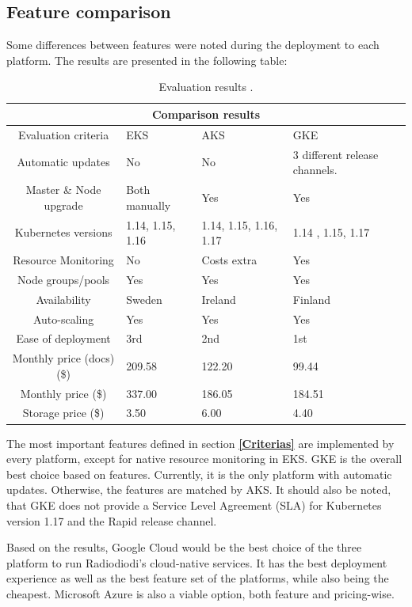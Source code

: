 \documentclass[article]{aaltoseries}
\begin{document}
\subsection{Feature comparison}

Some differences between features were noted during the deployment to each platform. The results are presented in the following table:

\begin{table}[hbt!]
\centering
\begin{tabular}{ |c|p{7em}|p{5.5em}|p{9em}| }
\hline
\multicolumn{4}{|c|}{Comparison results} \\
\hline
Evaluation criteria & EKS & AKS & GKE \\
\hline
Automatic updates
& No
& No
& 3 different release channels. \\
Master \& Node upgrade & Both manually & Yes & Yes \\
Kubernetes versions & 1.14, 1.15, 1.16 & 1.14, 1.15, 1.16, 1.17 & 1.14 , 1.15, 1.17 \\
Resource Monitoring & No & Costs extra & Yes \\
Node groups/pools & Yes & Yes & Yes  \\
Availability & Sweden & Ireland & Finland  \\
Auto-scaling & Yes & Yes & Yes  \\
\hline
Ease of deployment & 3rd & 2nd & 1st \\
Monthly price (docs) (\$) & 209.58 & 122.20 & 99.44\footnotemark \\
Monthly price (\$) & 337.00 & 186.05 & 184.51 \\
Storage price (\$) & 3.50 & 6.00 & 4.40 \\
\hline
\end{tabular}
\caption{Evaluation results \cite{eks}\cite{gke}\cite{aks}.}
\label{tab:template}
\end{table}

The most important features defined in section \textbf{\ref{Criterias}} are implemented by every platform, except for native resource monitoring in EKS. GKE is the overall best choice based on features. Currently, it is the only platform with automatic updates. Otherwise, the features are matched by AKS. It should also be noted, that GKE does not provide a Service Level Agreement (SLA) for Kubernetes version 1.17 and the Rapid release channel.

Based on the results, Google Cloud would be the best choice of the three platform to run Radiodiodi's cloud-native services. It has the best deployment experience as well as the best feature set of the platforms, while also being the cheapest. Microsoft Azure is also a viable option, both feature and pricing-wise.
\end{document}
